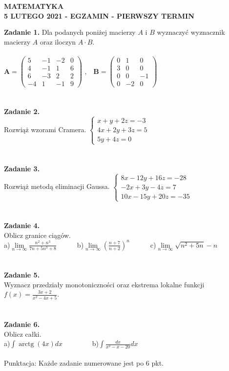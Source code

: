 \documentclass[12pt,a4paper]{report}
\begin{document}
\begin{center}

\textbf{MATEMATYKA \\5 LUTEGO 2021 - EGZAMIN - PIERWSZY TERMIN}

\end{center}\textbf{Zadanie 1.}  Dla podanych poniżej macierzy $A$ i $B$ wyznaczyć wyznacznik macierzy $A$ oraz iloczyn $A\cdot B$. \\\\ $ \mathbf{A} =\left( \begin{array}{cccc}5 & -1& -2 & 0\\4 & -1&1 & 6\\6 & -3& 2 & 2\\-4 & 1 & -1 & 9 \end{array} \right)$ ,\ \ $\mathbf{B} =\left( \begin{array}{ccc}0 & 1& 0\\3 & 0& 0\\0 & 0& -1\\0 & -2& 0\end{array} \right)$\\\\\\\textbf{Zadanie 2.} \\Rozwiąż wzorami Cramera. $\left\{ \begin{array}{ll}x+y+2z=-3\\4x+2y+3z=5\\5y+4z=0\end{array} \right.$\\\\\\\textbf{Zadanie 3.} \\Rozwiąż metodą eliminacji Gaussa. $\left\{ \begin{array}{ll}8x-12y+16z=-28\\-2x+3y-4z=7\\10x-15y+20z=-35\end{array} \right.$\\\\\\\textbf{Zadanie 4.} \\Oblicz granice ciągów.\\a)$\lim\limits_{n\to\infty}\frac{n^2+n^3}{7n+5n^3+8}$\ \ \ \ \ \  b)$\lim\limits_{n\to \infty}(\frac{n+7}{n+2})^n$\ \ \ \ \ \ c)$\lim\limits_{n\to\infty} \sqrt{n^2+5n}-n$\\\\\\\textbf{Zadanie 5.} \\Wyznacz przedziały monotoniczności oraz ekstrema lokalne funkcji $f(x)=\frac{3x+2}{x^2-4x+5}$.\\\\\\\textbf{Zadanie 6.} \\Oblicz całki. \\a)$\int \operatorname{arctg}(4x) dx$ \ \ \ \ \ \ \ \ b)$\int \frac{dx}{x^2-x-20} dx$\\\\Punktacja: Każde zadanie numerowane jest po 6 pkt.
\end{document}
